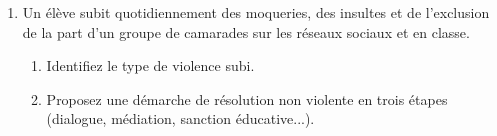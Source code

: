 \documentclass[11pt]{article}
\begin{document}
\begin{exercice}
\begin{enumerate}
    \item Un élève subit quotidiennement des moqueries, des insultes et de l'exclusion de la part d'un groupe de camarades sur les réseaux sociaux et en classe. 
    \begin{enumerate}
        \item Identifiez le type de violence subi.
        \item Proposez une démarche de résolution non violente en trois étapes (dialogue, médiation, sanction éducative...).
    \end{enumerate}
\end{enumerate}
\end{exercice}
\end{document}
